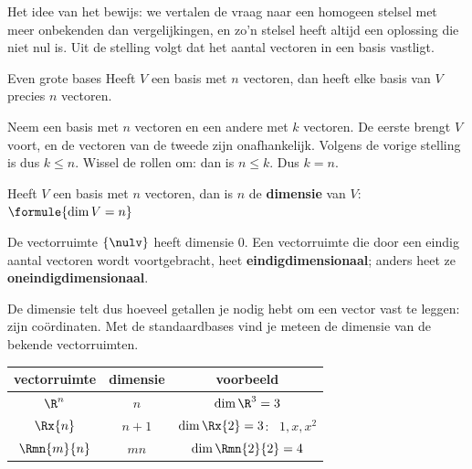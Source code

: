 Het idee van het bewijs: we vertalen de vraag naar een homogeen stelsel met meer onbekenden dan vergelijkingen, en zo'n stelsel heeft altijd een oplossing die niet nul is. Uit de stelling volgt dat het aantal vectoren in een basis vastligt.

\begin{theorie}
\begin{stelling}{Even grote bases}
Heeft $V$ een basis met $n$ vectoren, dan heeft elke basis van $V$ precies $n$ vectoren.
\end{stelling}

\begin{bewijs}
Neem een basis met $n$ vectoren en een andere met $k$ vectoren. De eerste brengt $V$ voort, en de vectoren van de tweede zijn onafhankelijk. Volgens de vorige stelling is dus $k \leqslant n$. Wissel de rollen om: dan is $n \leqslant k$. Dus $k = n$.
\end{bewijs}

Heeft $V$ een basis met $n$ vectoren, dan is $n$ de \textbf{\textcolor{accent}{dimensie}} van $V$: \quad $\formule{\dim V = n}$

\vspace{1mm}
De vectorruimte $\{\nulv\}$ heeft dimensie 0. Een vectorruimte die door een eindig aantal vectoren wordt voortgebracht, heet \textbf{\textcolor{accent}{eindigdimensionaal}}; anders heet ze \textbf{\textcolor{accent}{oneindigdimensionaal}}.
\end{theorie}

De dimensie telt dus hoeveel getallen je nodig hebt om een vector vast te leggen: zijn coördinaten. Met de standaardbases vind je meteen de dimensie van de bekende vectorruimten.

\begin{center}
\renewcommand{\arraystretch}{1.45}
\begin{tabular}{|c|c|c|}
\hline
\rowcolor{accent!14} vectorruimte & dimensie & voorbeeld \\ \hline
$\R^n$ & $n$ & $\dim \R^3 = 3$ \\ \hline
$\Rx{n}$ & $n + 1$ & $\dim \Rx{2} = 3$: \ $1, x, x^2$ \\ \hline
$\Rmn{m}{n}$ & $mn$ & $\dim \Rmn{2}{2} = 4$ \\ \hline
\end{tabular}
\end{center}

